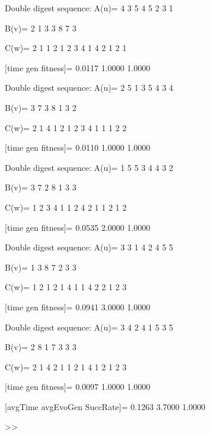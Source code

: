 Double digest sequence:
A(u)=
     4     3     5     4     5     2     3     1

B(v)=
     2     1     3     3     8     7     3

C(w)=
     2     1     1     2     1     2     3     4     1     4     2     1     2     1

[time gen fitness]=
    0.0117    1.0000    1.0000

Double digest sequence:
A(u)=
     2     5     1     3     5     4     3     4

B(v)=
     3     7     3     8     1     3     2

C(w)=
     2     1     4     1     2     1     2     3     4     1     1     1     2     2

[time gen fitness]=
    0.0110    1.0000    1.0000

Double digest sequence:
A(u)=
     1     5     5     3     4     4     3     2

B(v)=
     3     7     2     8     1     3     3

C(w)=
     1     2     3     4     1     1     2     4     2     1     1     2     1     2

[time gen fitness]=
    0.0535    2.0000    1.0000

Double digest sequence:
A(u)=
     3     3     1     4     2     4     5     5

B(v)=
     1     3     8     7     2     3     3

C(w)=
     1     2     1     2     1     4     1     1     4     2     2     1     2     3

[time gen fitness]=
    0.0941    3.0000    1.0000

Double digest sequence:
A(u)=
     3     4     2     4     1     5     3     5

B(v)=
     2     8     1     7     3     3     3

C(w)=
     2     1     4     2     1     1     2     1     4     1     2     1     2     3

[time gen fitness]=
    0.0097    1.0000    1.0000

[avgTime  avgEvoGen  SuccRate]=
    0.1263    3.7000    1.0000

>> 